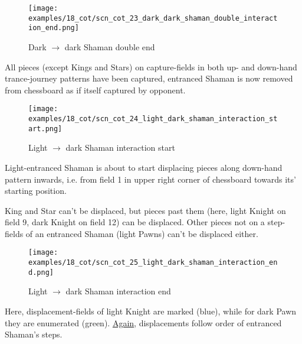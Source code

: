\noindent
\begin{figure}[!h]
\texttt{[image: examples/18\_cot/scn\_cot\_23\_dark\_dark\_shaman\_double\_interaction\_end.png]}
\caption{Dark $\rightarrow$ dark Shaman double end}
\label{fig:scn_cot_23_dark_dark_shaman_double_interaction_end}
\end{figure}

All pieces (except Kings and Stars) on capture-fields in both up- and down-hand trance-journey
patterns have been captured, entranced Shaman is now removed from chessboard as if itself
captured by opponent.

\clearpage %

\noindent
\begin{figure}[!h]
\texttt{[image: examples/18\_cot/scn\_cot\_24\_light\_dark\_shaman\_interaction\_start.png]}
\caption{Light $\rightarrow$ dark Shaman interaction start}
\label{fig:scn_cot_24_light_dark_shaman_interaction_start}
\end{figure}

Light-entranced Shaman is about to start displacing pieces along down-hand pattern inwards,
i.e. from field 1 in upper right corner of chessboard towards its' starting position.

King and Star can't be displaced, but pieces past them (here, light Knight on field 9, dark Knight
on field 12) can be displaced. Other pieces not on a step-fields of an entranced Shaman (light
Pawns) can't be displaced either.

\clearpage %

\noindent
\begin{figure}[!h]
\texttt{[image: examples/18\_cot/scn\_cot\_25\_light\_dark\_shaman\_interaction\_end.png]}
\caption{Light $\rightarrow$ dark Shaman interaction end}
\label{fig:scn_cot_25_light_dark_shaman_interaction_end}
\end{figure}

Here, displacement-fields of light Knight are marked (blue), while for dark Pawn they are
enumerated (green). \hyperref[fig:scn_cot_17_light_light_shaman_interaction_end]{Again}, displacements follow order of entranced Shaman's steps.

